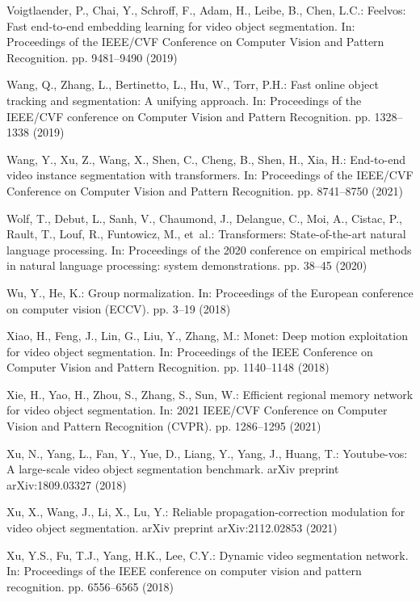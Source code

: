 \documentclass[runningheads]{llncs}
\begin{document}
\begin{thebibliography}{10}
Voigtlaender, P., Chai, Y., Schroff, F., Adam, H., Leibe, B., Chen, L.C.:
  Feelvos: Fast end-to-end embedding learning for video object segmentation.
  In: Proceedings of the IEEE/CVF Conference on Computer Vision and Pattern
  Recognition. pp. 9481--9490 (2019)

Wang, Q., Zhang, L., Bertinetto, L., Hu, W., Torr, P.H.: Fast online object
  tracking and segmentation: A unifying approach. In: Proceedings of the
  IEEE/CVF conference on Computer Vision and Pattern Recognition. pp.
  1328--1338 (2019)

Wang, Y., Xu, Z., Wang, X., Shen, C., Cheng, B., Shen, H., Xia, H.: End-to-end
  video instance segmentation with transformers. In: Proceedings of the
  IEEE/CVF Conference on Computer Vision and Pattern Recognition. pp.
  8741--8750 (2021)

Wolf, T., Debut, L., Sanh, V., Chaumond, J., Delangue, C., Moi, A., Cistac, P.,
  Rault, T., Louf, R., Funtowicz, M., et~al.: Transformers: State-of-the-art
  natural language processing. In: Proceedings of the 2020 conference on
  empirical methods in natural language processing: system demonstrations. pp.
  38--45 (2020)

Wu, Y., He, K.: Group normalization. In: Proceedings of the European conference
  on computer vision (ECCV). pp. 3--19 (2018)

Xiao, H., Feng, J., Lin, G., Liu, Y., Zhang, M.: Monet: Deep motion
  exploitation for video object segmentation. In: Proceedings of the IEEE
  Conference on Computer Vision and Pattern Recognition. pp. 1140--1148 (2018)

Xie, H., Yao, H., Zhou, S., Zhang, S., Sun, W.: Efficient regional memory
  network for video object segmentation. In: 2021 IEEE/CVF Conference on
  Computer Vision and Pattern Recognition (CVPR). pp. 1286--1295 (2021)

Xu, N., Yang, L., Fan, Y., Yue, D., Liang, Y., Yang, J., Huang, T.:
  Youtube-vos: A large-scale video object segmentation benchmark. arXiv
  preprint arXiv:1809.03327  (2018)

Xu, X., Wang, J., Li, X., Lu, Y.: Reliable propagation-correction modulation
  for video object segmentation. arXiv preprint arXiv:2112.02853  (2021)

Xu, Y.S., Fu, T.J., Yang, H.K., Lee, C.Y.: Dynamic video segmentation network.
  In: Proceedings of the IEEE conference on computer vision and pattern
  recognition. pp. 6556--6565 (2018)


\end{thebibliography}
\end{document}
